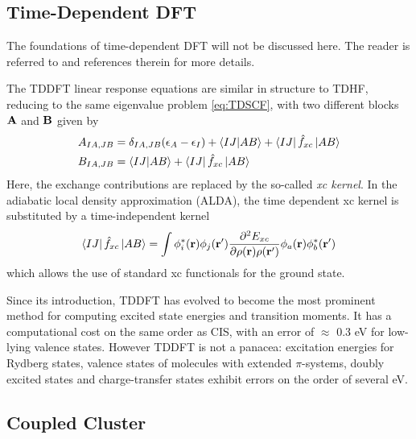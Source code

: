 \subsection{Time-Dependent DFT}

The foundations of time-dependent DFT  will not be discussed here. The reader is referred to \cite{Dre2005} and references therein for more details. 

The TDDFT linear response equations are similar in structure to TDHF, reducing to the same eigenvalue problem \ref{eq:TDSCF}, with two different blocks $\mathbf{A}$ and $\mathbf{B}$ given by
\begin{align}
A_{IA,JB} &= \delta_{IA,JB} (\epsilon_A - \epsilon_I) + \bra{\smash{IJ}}\ket{\smash{AB}} +  \bra{\smash{IJ}}\hat{f}_{xc} \ket{\smash{AB}}  \\
B_{IA,JB} &= \bra{\smash{IJ}}\ket{\smash{AB}} + \bra{\smash{IJ}}\hat{f}_{xc} \ket{\smash{AB}}
\end{align}
\noindent Here, the exchange contributions are replaced by the so-called \emph{xc kernel}. In the adiabatic local density approximation (ALDA), the time dependent xc kernel is substituted by a time-independent kernel 
\begin{equation}
\bra{\smash{IJ}}\hat{f}_{xc} \ket{\smash{AB}} = \int \phi^*_i(\mathbf{r}) \phi_j(\mathbf{r}') \frac{\partial^2 E_{xc}}{\partial\rho(\mathbf{r})\rho(\mathbf{r}')} \phi_a (\mathbf{r}) \phi_b^*(\mathbf{r}')
\end{equation}
\noindent which allows the use of standard xc functionals for the ground state. 

Since its introduction, TDDFT has evolved to become the most prominent method for computing excited state energies and transition moments. It has a computational cost on the same order as CIS, with an error of $\approx$ 0.3 eV \cite{Lau2013} for low-lying valence states. However TDDFT is not a panacea: excitation energies for Rydberg states, valence states of molecules with extended $\pi$-systems, doubly excited states and charge-transfer states exhibit errors on the order of several eV.



\subsection{Coupled Cluster}

